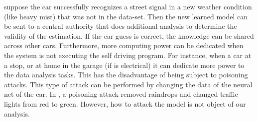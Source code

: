 \documentclass[acmsmall, screen,timestamp,nonacm]{acmart}
\begin{document}
\begin{enumerate}
		suppose the car successfully recognizes a street signal in a new weather
		condition (like heavy mist) that was not in the data-set. Then the new
		learned model can be sent to a central authority that does additional
		analysis to determine the validity of the estimation. If the car guess
		is correct, the knowledge can be shared across other cars.
		Furthermore, more computing power can be dedicated when the system is
		not executing the self driving program. For instance, when a car at a stop, or at home in the garage (if is
		electrical) it can dedicate more power to the data analysis tasks. This
		has the disadvantage of being subject to poisoning attacks.
		This type of attack can be performed by changing the data of the neural net
		of the car.
		In \cite{Ding2019PoisoningAO}, a poisoning attack removed raindrops and
		changed traffic lights from red to green. However, how to attack the
		model is not object of our analysis. 
\end{enumerate}

\end{document}
